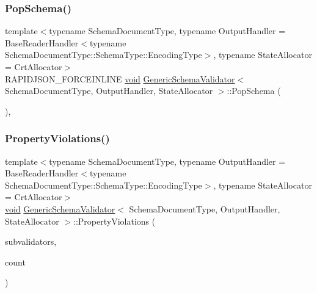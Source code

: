 \mbox{\label{classGenericSchemaValidator_a6cc7f347eace3847c428fce684c97b56}} 
\subsubsection{\texorpdfstring{Pop\+Schema()}{PopSchema()}}
{\footnotesize\ttfamily template$<$typename Schema\+Document\+Type, typename Output\+Handler = Base\+Reader\+Handler$<$typename Schema\+Document\+Type\+::\+Schema\+Type\+::\+Encoding\+Type$>$, typename State\+Allocator = Crt\+Allocator$>$ \\
R\+A\+P\+I\+D\+J\+S\+O\+N\+\_\+\+F\+O\+R\+C\+E\+I\+N\+L\+I\+NE \hyperlink{imgui__impl__opengl3__loader_8h_ac668e7cffd9e2e9cfee428b9b2f34fa7}{void} \hyperlink{classGenericSchemaValidator}{Generic\+Schema\+Validator}$<$ Schema\+Document\+Type, Output\+Handler, State\+Allocator $>$\+::Pop\+Schema (\begin{DoxyParamCaption}{ }\end{DoxyParamCaption})\hspace{0.3cm}{\ttfamily [inline]}, {\ttfamily [private]}}

\mbox{\label{classGenericSchemaValidator_a29fa7c6f787450b2df1f9d440436aeab}} 
\subsubsection{\texorpdfstring{Property\+Violations()}{PropertyViolations()}}
{\footnotesize\ttfamily template$<$typename Schema\+Document\+Type, typename Output\+Handler = Base\+Reader\+Handler$<$typename Schema\+Document\+Type\+::\+Schema\+Type\+::\+Encoding\+Type$>$, typename State\+Allocator = Crt\+Allocator$>$ \\
\hyperlink{imgui__impl__opengl3__loader_8h_ac668e7cffd9e2e9cfee428b9b2f34fa7}{void} \hyperlink{classGenericSchemaValidator}{Generic\+Schema\+Validator}$<$ Schema\+Document\+Type, Output\+Handler, State\+Allocator $>$\+::Property\+Violations (\begin{DoxyParamCaption}\item[{I\+Schema\+Validator $\ast$$\ast$}]{subvalidators,  }\item[{\hyperlink{rapidjson_8h_a5ed6e6e67250fadbd041127e6386dcb5}{Size\+Type}}]{count }\end{DoxyParamCaption})\hspace{0.3cm}{\ttfamily [inline]}}

